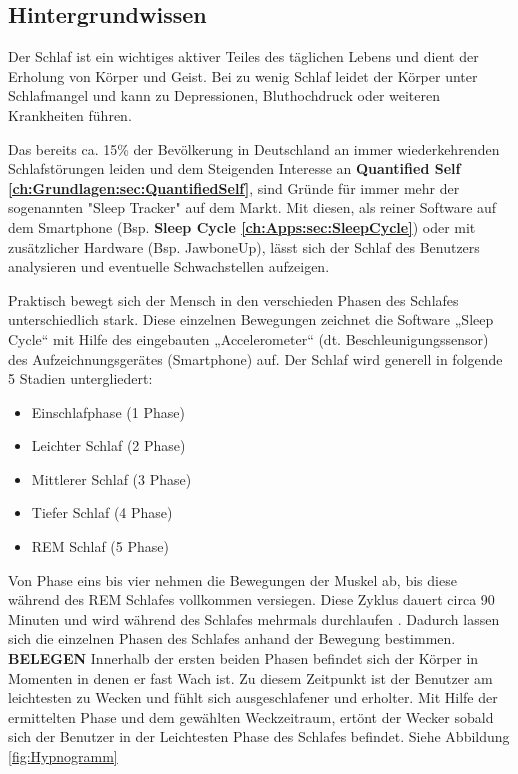 \subsection{Hintergrundwissen}
\label{ch:Apps:sec:Sleepcycle:subsec:H}

Der Schlaf ist ein wichtiges aktiver Teiles des täglichen Lebens und dient der Erholung von Körper und Geist.
Bei zu wenig Schlaf leidet der Körper unter Schlafmangel und kann zu Depressionen, Bluthochdruck oder weiteren Krankheiten führen. \cite{Chen:SleepMonitoring}

Das bereits ca. 15\% der Bevölkerung in Deutschland an immer wiederkehrenden Schlafstörungen leiden und dem Steigenden Interesse an \textbf{Quantified Self \ref{ch:Grundlagen:sec:QuantifiedSelf}}, sind Gründe für immer mehr der sogenannten "Sleep Tracker" auf dem Markt. %
Mit diesen, als reiner Software auf dem Smartphone (Bsp. \textbf{Sleep Cycle \ref{ch:Apps:sec:SleepCycle}}) oder mit zusätzlicher Hardware (Bsp. JawboneUp), lässt sich der Schlaf des Benutzers analysieren und eventuelle Schwachstellen aufzeigen.

Praktisch bewegt sich der Mensch in den verschieden Phasen des Schlafes unterschiedlich stark.
Diese einzelnen Bewegungen zeichnet die Software „Sleep Cycle“ mit Hilfe des eingebauten „Accelerometer“ (dt. Beschleunigungssensor) des Aufzeichnungsgerätes (Smartphone) auf.
Der Schlaf wird generell in folgende 5 Stadien untergliedert:

\begin{itemize}
	\item Einschlafphase (1 Phase)
	\item Leichter Schlaf (2 Phase)
	\item Mittlerer Schlaf (3 Phase)
	\item Tiefer Schlaf (4 Phase)
	\item REM Schlaf (5 Phase)
\end{itemize}

Von Phase eins bis vier nehmen die Bewegungen der Muskel ab, bis diese während des REM Schlafes vollkommen versiegen.
Diese Zyklus dauert circa 90 Minuten und wird während des Schlafes mehrmals durchlaufen \cite{Medicine:Schlaf}.
Dadurch lassen sich die einzelnen Phasen des Schlafes anhand der Bewegung bestimmen. \textbf{BELEGEN}
Innerhalb der ersten beiden Phasen befindet sich der Körper in Momenten in denen er fast Wach ist. Zu diesem Zeitpunkt ist der Benutzer am leichtesten zu Wecken und fühlt sich ausgeschlafener und erholter.
Mit Hilfe der ermittelten Phase und dem gewählten Weckzeitraum, ertönt der Wecker sobald sich der Benutzer in der Leichtesten Phase des Schlafes befindet. Siehe Abbildung \ref{fig:Hypnogramm}


